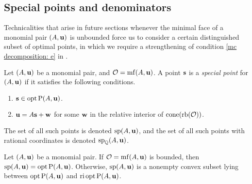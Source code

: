\documentclass[11pt]{amsart}
\begin{document}
\subsection{Special points and denominators}

Technicalities that arise in future sections whenever the minimal face of a monomial pair $(A, \mathbf{u})$ is unbounded force us to consider a certain distinguished subset of optimal points, in which we require a strengthening of condition \eqref{mc decomposition: e} in .

\begin{definition}
\label{mc: D} 
Let $(A,\mathbf{u})$ be a monomial pair, and $\mathcal{O} = \operatorname{mf}(A, \mathbf{u})$.  A point $\mathbf{s}$ is a \emph{special point} for $(A, \mathbf{u})$ if it satisfies the following conditions.
\begin{enumerate}
\item $\mathbf{s} \in \operatorname{opt} \mathrm{P}(A, \mathbf{u})$.
\item $\mathbf{u} = A \mathbf{s} + \mathbf{w}$ for some $\mathbf{w}$ in the relative interior of $\operatorname{cone} ( \operatorname{rb}(\mathcal{O}))$.  
\end{enumerate}
The set of all such points is denoted $\operatorname{sp}(A, \mathbf{u})$, and the set of all such points with rational coordinates is denoted $\operatorname{sp}_{\mathbb{Q}}(A, \mathbf{u})$.  
\end{definition}

\begin{proposition}  
   \label{opt versus mc: P}
   Let $(A,\mathbf{u})$ be a monomial pair.
   If $\mathcal{O} = \operatorname{mf}(A, \mathbf{u})$ is bounded, then $\operatorname{sp}(A, \mathbf{u}) = \operatorname{opt} \mathrm{P}(A, \mathbf{u})$.  Otherwise,  $\operatorname{sp}(A, \mathbf{u})$ is a nonempty convex subset lying between $\operatorname{opt} \mathrm{P}(A, \mathbf{u})$ and $\operatorname{ri} \operatorname{opt} \mathrm{P}(A, \mathbf{u})$. 
\end{proposition}
\end{document}
